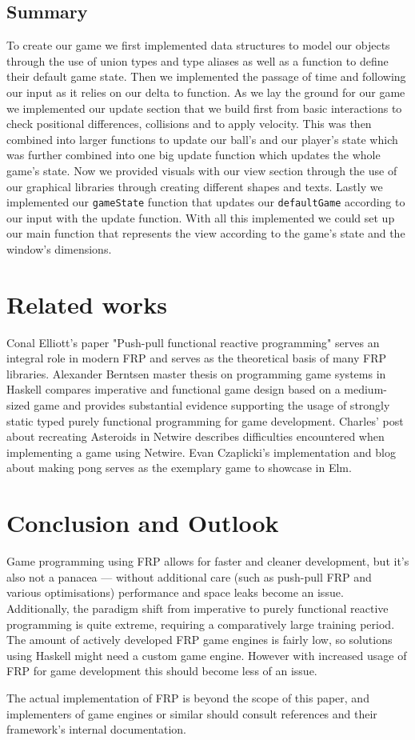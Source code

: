 \documentclass[pdftex,a4paper]{extarticle}
\begin{document}
\subsection{Summary}
To create our game we first implemented data structures to model our objects through the use of union types and type aliases as well as a function to define their default game state.
Then we implemented the passage of time and following our input as it relies on our delta to function.
As we lay the ground for our game we implemented our update section that we build first from basic interactions to check positional differences, collisions and to apply velocity.
This was then combined into larger functions to update our ball's and our player's state which was further combined into one big update function which updates the whole game's state.
Now we provided visuals with our view section through the use of our graphical libraries through creating different shapes and texts.
Lastly we implemented our {\tt gameState} function that updates our {\tt defaultGame} according to our input with the update function.
With all this implemented we could set up our main function that represents the view according to the game's state and the window's dimensions.

\section{Related works}
\label{sec:related}
Conal Elliott's paper "Push-pull functional reactive programming" \cite{Elliott2009-push-pull-frp} serves an integral role in modern FRP
and serves as the theoretical basis of many FRP libraries. Alexander Berntsen master thesis on programming game systems in Haskell \cite{Berntsen2014-game-systems-haskell} compares imperative and functional game design based on a medium-sized game and provides substantial evidence supporting the usage of strongly static typed purely functional programming for game development. Charles' post about recreating Asteroids in Netwire \cite{asteroids} describes difficulties encountered when implementing a game using Netwire.
Evan Czaplicki's implementation and blog about making pong\cite{elm-pong, elm-making-pong} serves as the exemplary game to showcase in Elm.
\section{Conclusion and Outlook}
\label{sec:conclusion}
Game programming using FRP allows for faster and cleaner development, but it's also not a panacea --- without additional care (such as push-pull FRP\cite{Elliott2009-push-pull-frp} and various optimisations) performance and space leaks become an issue. Additionally, the paradigm shift from imperative to purely functional reactive programming is quite extreme, requiring a comparatively large training period. The amount of actively developed FRP game engines is fairly low\cite{hackage-frp}, so solutions using Haskell might need a custom game engine. However with increased usage of FRP for game development this should become less of an issue.

The actual implementation of FRP is beyond the scope of this paper, and implementers of game engines or similar should consult references and their framework's internal documentation.



\end{document}
